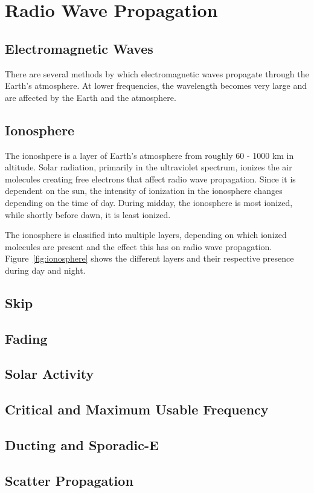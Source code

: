 \section{Radio Wave Propagation}

\subsection{Electromagnetic Waves}

There are several methods by which electromagnetic waves propagate through the Earth's atmosphere. At lower frequencies, the wavelength becomes very large and are affected by the Earth and the atmosphere.

\subsection{Ionosphere}

The ionoshpere is a layer of Earth's atmosphere from roughly 60 - 1000 km in altitude. Solar radiation, primarily in the ultraviolet spectrum, ionizes the air molecules creating free electrons that affect radio wave propagation. Since it is dependent on the sun, the intensity of ionization in the ionosphere changes depending on the time of day. During midday, the ionosphere is most ionized, while shortly before dawn, it is least ionized.

The ionosphere is classified into multiple layers, depending on which ionized molecules are present and the effect this has on radio wave propagation. Figure~\ref{fig:ionosphere} shows the different layers and their respective presence during day and night.

\subsection{Skip}

\subsection{Fading}

\subsection{Solar Activity}

\subsection{Critical and Maximum Usable Frequency}

\subsection{Ducting and Sporadic-E}

\subsection{Scatter Propagation}
